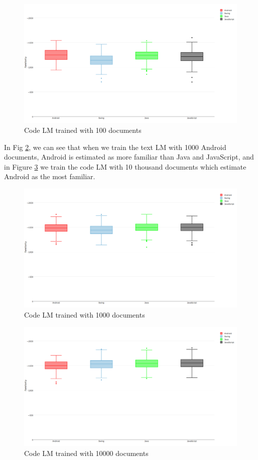 \documentclass[12pt,mscthesis]{usiinfthesis}
\begin{document}
{\begin{figure}[H]
			\centering
			\includegraphics[width=\textwidth]{text100}
			\caption{Code LM trained with 100 documents}
			\label{text100}
\end{figure}

In Fig \ref{text1000}, we can see that when we train the text LM with 1000 Android documents, Android is estimated as more familiar than Java and JavaScript, and in Figure \ref{text10000} we train the code LM with 10 thousand documents which estimate Android as the most familiar.

\begin{figure}[H]
			\centering
			\includegraphics[width=\textwidth]{text1000}
			\caption{Code LM trained with 1000 documents}
			\label{text1000}
\end{figure}

\begin{figure}[H]
			\centering
			\includegraphics[width=\textwidth]{text10000}
			\caption{Code LM trained with 10000 documents}
			\label{text10000}
\end{figure}

}
\end{document}
